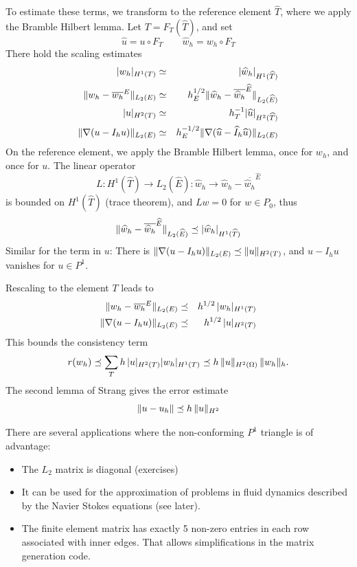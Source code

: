 To estimate these terms, we transform to the reference element $\widehat T$, 
where we apply the Bramble Hilbert lemma. Let $T = F_T(\widehat T)$, and set
$$
\widehat u = u \circ F_T \qquad \widehat w_h = w_h \circ F_T
$$
There hold the scaling estimates
\begin{eqnarray*}
| w_h |_{H^1(T)} & \simeq & | \widehat w_h |_{H^1(\widehat T)} \\
\| w_h - \overline {w_h}^E \|_{L_2(E)} & \simeq & h_E^{1/2} \| \widehat w_h - \overline{\widehat w_h}^{\widehat E} \|_{L_2(\widehat E)} \\
| u |_{H^2(T)} & \simeq & h_T^{-1} |  \widehat u |_{H^2(\widehat T)} \\
\| \nabla (u - I_h u) \|_{L_2(E)} & \simeq & h_E^{-1/2} \| \nabla (\widehat u - \widehat I_h \widehat u) \|_{L_2(E)}
\end{eqnarray*}
On the reference element, we apply the Bramble Hilbert lemma, once for $w_h$, 
and once for $u$. The linear operator 
$$
L : H^1(\widehat T) \rightarrow L_2(\widehat E) :
 \widehat w_h \rightarrow  \widehat w_h - \overline {\widehat w_h}^{\widehat E}
$$
is bounded on $H^1(\widehat T)$ (trace theorem), and $L w = 0$ for $w \in P_0$,
thus
$$
\| \widehat w_h - \overline{\widehat w_h}^{\widehat E} \|_{L_2(\widehat E)}
\preceq | \widehat w_h |_{H^1(\widehat T)}
$$
Similar for the term in $u$: There is $\| \nabla (u - I_h u) \|_{L_2(E)} \preceq \| u \|_{H^2(T)}$, and $u - I_h u$ vanishes for $u \in P^1$. 

Rescaling to the element $T$ leads to
\begin{eqnarray*}
\| w_h - \overline{w_h}^E \|_{L_2(E)} & \preceq & h^{1/2} \, | w_h |_{H^1(T)} \\
\| \nabla (u - I_h u) \|_{L_2(E)} & \preceq & h^{1/2} \, | u |_{H^2(T)}
\end{eqnarray*}
This bounds the consistency term
$$
r(w_h) \preceq \sum_T h \, | u |_{H^2(T)} | w_h |_{H^1(T)} \preceq h \, \| u \|_{H^2(\Omega)} \, \| w_h \|_h.
$$
The second lemma of Strang gives the error estimate
$$
\| u - u_h \| \preceq h \, \| u \|_{H^2}
$$ 

There are several applications where the non-conforming $P^1$ triangle
is of advantage:
\begin{itemize}
\item
The $L_2$ matrix is diagonal (exercises)
\item
It can be used for the approximation of problems in fluid dynamics
described by the Navier Stokes equations (see later).
\item
The finite element matrix has exactly 5 non-zero entries in each row
associated with inner edges. That allows simplifications in the matrix
generation code.
\end{itemize}




